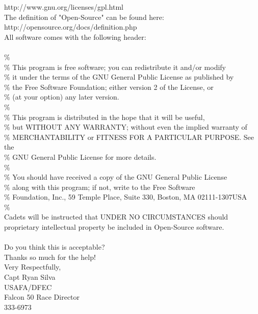 \documentclass[10pt]{article}
\begin{document}
http://www.gnu.org/licenses/gpl.html \\

\noindent The definition of "Open-Source" can be found here: \\

http://opensource.org/docs/definition.php \\

\noindent All software comes with the following header: \\
 \\
\% \\
\%    This program is free software; you can redistribute it and/or modify \\
\%    it under the terms of the GNU General Public License as published by \\
\%    the Free Software Foundation; either version 2 of the License, or \\
\%    (at your option) any later version. \\
\% \\
\%    This program is distributed in the hope that it will be useful, \\
\%    but WITHOUT ANY WARRANTY; without even the implied warranty of \\
\%    MERCHANTABILITY or FITNESS FOR A PARTICULAR PURPOSE.  See the \\
\%    GNU General Public License for more details. \\
\% \\
\%    You should have received a copy of the GNU General Public License \\
\%    along with this program; if not, write to the Free Software \\
\%    Foundation, Inc., 59 Temple Place, Suite 330, Boston, MA  02111-1307USA \\
\%  \\

\noindent Cadets will be instructed that UNDER NO CIRCUMSTANCES should proprietary intellectual property be included in Open-Source software. \\
\hspace{0pt} \\
\noindent Do you think this is acceptable? \\

\noindent Thanks so much for the help! \\

\noindent Very Respectfully, \\
Capt Ryan Silva \\
USAFA/DFEC \\
Falcon 50 Race Director \\
333-6973 \\
\end{document}
